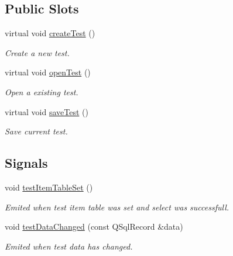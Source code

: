 \subsection*{Public Slots}
\begin{DoxyCompactItemize}
\item 
virtual void \hyperlink{classmdt_tt_abstract_test_widget_a19577756bde2ada4f8e7947b88bf234f}{create\-Test} ()
\begin{DoxyCompactList}\small\item\em Create a new test. \end{DoxyCompactList}\item 
virtual void \hyperlink{classmdt_tt_abstract_test_widget_ac0f6debd3cc7b283c3a51913dcee865f}{open\-Test} ()
\begin{DoxyCompactList}\small\item\em Open a existing test. \end{DoxyCompactList}\item 
virtual void \hyperlink{classmdt_tt_abstract_test_widget_a7af5b7ce283032f05bb487e99510006c}{save\-Test} ()
\begin{DoxyCompactList}\small\item\em Save current test. \end{DoxyCompactList}\end{DoxyCompactItemize}
\subsection*{Signals}
\begin{DoxyCompactItemize}
\item 
void \hyperlink{classmdt_tt_abstract_test_widget_a7c3e8e5895dc9f7482710520ef528d03}{test\-Item\-Table\-Set} ()
\begin{DoxyCompactList}\small\item\em Emited when test item table was set and select was successfull. \end{DoxyCompactList}\item 
void \hyperlink{classmdt_tt_abstract_test_widget_a1845beb34b4be891f71403974c229b7f}{test\-Data\-Changed} (const Q\-Sql\-Record \&data)
\begin{DoxyCompactList}\small\item\em Emited when test data has changed. \end{DoxyCompactList}\end{DoxyCompactItemize}
